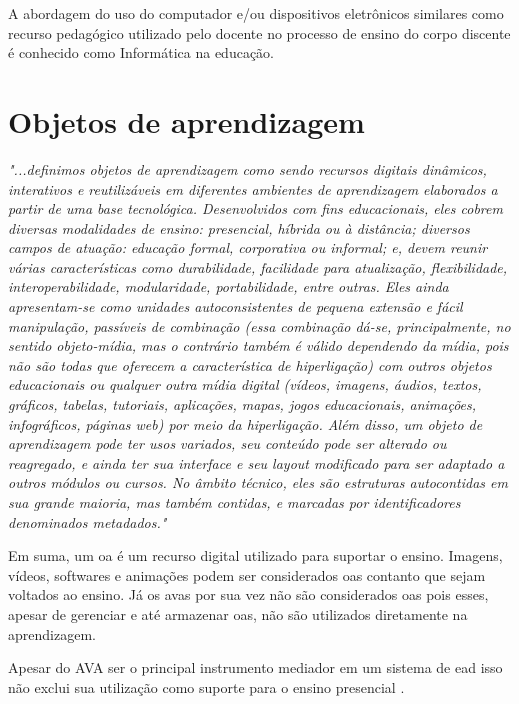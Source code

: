 A abordagem do uso do computador e/ou dispositivos eletrônicos similares como recurso pedagógico utilizado pelo docente no processo de ensino do corpo discente é conhecido como Informática na educação. \cite{kenski07}

\section{Objetos de aprendizagem}
\label{sec:objetosaprendizagem}

\textit{"...definimos objetos de aprendizagem como sendo recursos digitais dinâmicos, interativos e reutilizáveis em diferentes ambientes de aprendizagem elaborados a partir de uma base tecnológica. Desenvolvidos com fins educacionais, eles cobrem diversas modalidades de ensino: presencial, híbrida ou à distância; diversos campos de atuação: educação formal, corporativa ou informal; e, devem reunir várias características como durabilidade, facilidade para atualização, flexibilidade, interoperabilidade, modularidade, portabilidade, entre outras. Eles ainda apresentam-se como unidades autoconsistentes de pequena extensão e fácil manipulação, passíveis de combinação (essa combinação dá-se, principalmente, no sentido objeto-mídia, mas o contrário também é válido dependendo da mídia, pois não são todas que oferecem a característica de hiperligação) com outros objetos educacionais ou qualquer outra mídia digital (vídeos, imagens, áudios, textos, gráficos, tabelas, tutoriais, aplicações, mapas, jogos educacionais, animações, infográficos, páginas web) por meio da hiperligação. Além disso, um objeto de aprendizagem pode ter usos variados, seu conteúdo pode ser alterado ou reagregado, e ainda ter sua interface e seu layout modificado para ser adaptado a outros módulos ou cursos. No âmbito técnico, eles são estruturas autocontidas em sua grande maioria, mas também contidas, e marcadas por identificadores denominados metadados."} \cite{audino12}

Em suma, um \acrfull{oa} é um recurso digital utilizado para suportar o ensino. Imagens, vídeos, softwares e animações podem ser considerados \acrshort{oa}s contanto que sejam voltados ao ensino. Já os \acrfull{avas} por sua vez não são considerados \acrshort{oa}s pois esses, apesar de gerenciar e até armazenar \acrshort{oa}s, não são utilizados diretamente na aprendizagem. \cite{wiley02} \cite{braga14}

Apesar do AVA ser o principal instrumento mediador em um sistema de \acrfull{ead} isso não exclui sua utilização como suporte para o ensino presencial \cite{belmonte10}.

